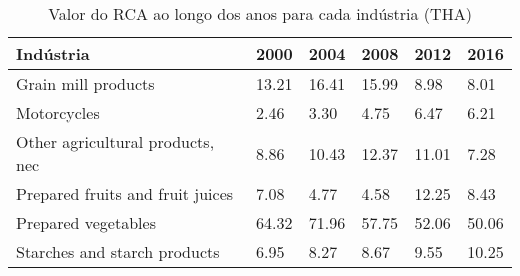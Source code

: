 \begin{table}
\centering
\caption{Valor do RCA ao longo dos anos para cada indústria (THA)}
\begin{tabular}{p{6cm}p{1.5cm}p{1.5cm}p{1.5cm}p{1.5cm}p{1.5cm}}
\toprule
                       Indústria &  2000 &  2004 &  2008 &  2012 &  2016 \\
\midrule
             Grain mill products & 13.21 & 16.41 & 15.99 &  8.98 &  8.01 \\
                     Motorcycles &  2.46 &  3.30 &  4.75 &  6.47 &  6.21 \\
Other agricultural products, nec &  8.86 & 10.43 & 12.37 & 11.01 &  7.28 \\
Prepared fruits and fruit juices &  7.08 &  4.77 &  4.58 & 12.25 &  8.43 \\
             Prepared vegetables & 64.32 & 71.96 & 57.75 & 52.06 & 50.06 \\
    Starches and starch products &  6.95 &  8.27 &  8.67 &  9.55 & 10.25 \\
\bottomrule
\end{tabular}
\end{table}
